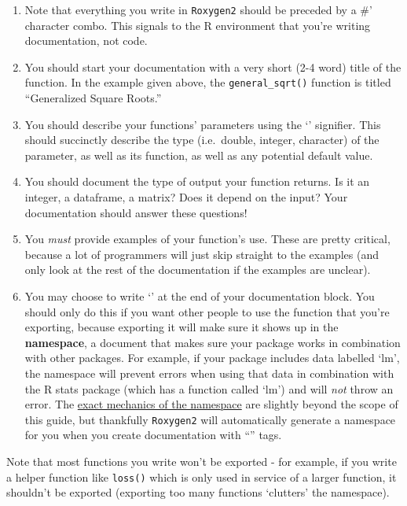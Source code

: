 \documentclass[
]{book}
\begin{document}
\begin{enumerate}
\def\labelenumi{\arabic{enumi}.}
\item
  Note that everything you write in \texttt{Roxygen2} should be preceded by a \#' character combo. This signals to the R environment that you're writing documentation, not code.
\item
  You should start your documentation with a very short (2-4 word) title of the function. In the example given above, the \texttt{general\_sqrt()} function is titled ``Generalized Square Roots.''
\item
  You should describe your functions' parameters using the `\citet{param}' signifier. This should succinctly describe the type (i.e.~double, integer, character) of the parameter, as well as its function, as well as any potential default value.
\item
  You should document the type of output your function returns. Is it an integer, a dataframe, a matrix? Does it depend on the input? Your documentation should answer these questions!
\item
  You \emph{must} provide examples of your function's use. These are pretty critical, because a lot of programmers will just skip straight to the examples (and only look at the rest of the documentation if the examples are unclear).
\item
  You may choose to write `\citet{export}' at the end of your documentation block. You should only do this if you want other people to use the function that you're exporting, because exporting it will make sure it shows up in the \textbf{namespace}, a document that makes sure your package works in combination with other packages. For example, if your package includes data labelled `lm', the namespace will prevent errors when using that data in combination with the R stats package (which has a function called `lm') and will \emph{not} throw an error. The \href{http://r-pkgs.had.co.nz/namespace.html}{exact mechanics of the namespace} are slightly beyond the scope of this guide, but thankfully \texttt{Roxygen2} will automatically generate a namespace for you when you create documentation with ``\citet{export}'' tags.
\end{enumerate}

Note that most functions you write won't be exported - for example, if you write a helper function like \texttt{loss()} which is only used in service of a larger function, it shouldn't be exported (exporting too many functions `clutters' the namespace).
\end{document}
